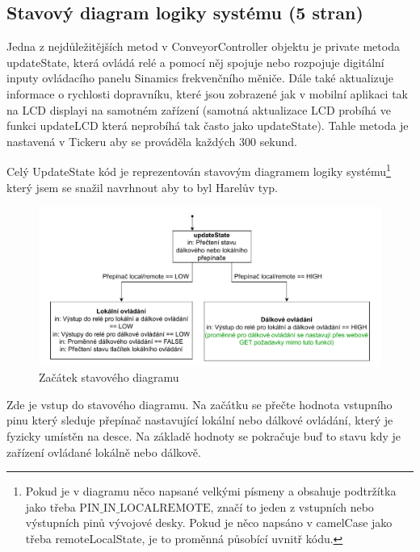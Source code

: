 \subsection{Stavový diagram logiky systému (5 stran)}\label{sec:UpdateStateStavovyDiagram}

Jedna z nejdůležitějších metod v ConveyorController objektu je private metoda updateState, která ovládá relé a pomocí něj spojuje nebo rozpojuje digitální inputy ovládacího panelu Sinamics frekvenčního měniče. Dále také aktualizuje informace o rychlosti dopravníku, které jsou zobrazené jak v mobilní aplikaci tak na LCD displayi na samotném zařízení (samotná aktualizace LCD probíhá ve funkci updateLCD která neprobíhá tak často jako updateState). Tahle metoda je nastavená v Tickeru aby se prováděla každých 300 sekund.

Celý UpdateState kód je reprezentován stavovým diagramem logiky systému\footnote{Pokud je v diagramu něco napsané velkými písmeny a obsahuje podtržítka jako třeba $\text{PIN\_IN\_LOCALREMOTE}$, značí to jeden z vstupních nebo výstupních pinů vývojové desky. Pokud je něco napsáno v camelCase jako třeba remoteLocalState, je to proměnná působící uvnitř kódu.} který jsem se snažil navrhnout aby to byl Harelův typ.

\begin{figure}[H]
    \centering
    \includegraphics[width=1\linewidth]{images/StateFlow_Firmwaru_top.drawio.pdf}
    \caption{Začátek stavového diagramu}
    \label{fig:StateFlow_Firmwaru_top}
\end{figure}

Zde je vstup do stavového diagramu. Na začátku se přečte hodnota vstupního pinu který sleduje přepínač nastavující lokální nebo dálkové ovládání, který je fyzicky umístěn na desce. Na základě hodnoty se pokračuje buď to stavu kdy je zařízení ovládané lokálně nebo dálkově.

